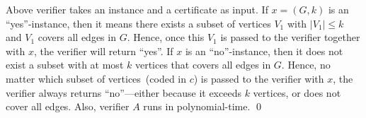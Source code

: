Above verifier takes an instance and a certificate as input.
If $x = (G, k)$ is an ``yes''-instance, then it means there exists a subset of vertices $V_1$
with $|V_1| \le k$ and $V_1$ covers all edges in $G$.
Hence, once this $V_1$ is passed to the verifier together with $x$,
the verifier will return ``yes''.
If $x$ is an ``no''-instance, then it does not exist a subset with at most $k$ vertices
that covers all edges in $G$.
Hence, no matter which subset of vertices~(coded in $c$) is passed to the verifier with $x$,
the verifier always returns ``no''---either because it exceeds $k$ vertices,
or does not cover all edges.  Also, verifier $A$ runs in polynomial-time.
\qed

